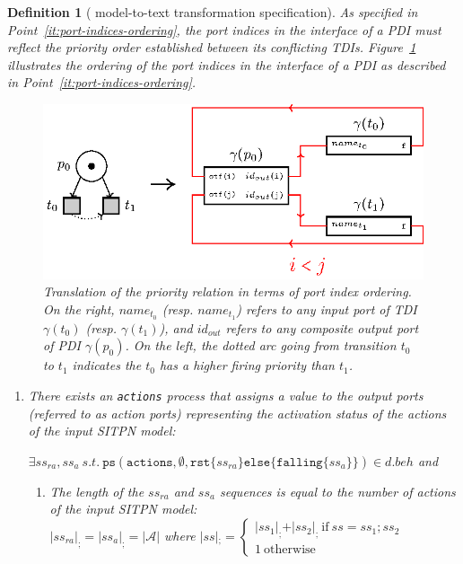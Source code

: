 \documentclass[pdflatex,sn-mathphys]{sn-jnl}%
\theoremstyle{thmstyleone}%
\theoremstyle{thmstyletwo}%
\theoremstyle{thmstylethree}%
\newtheorem{definition}{Definition}%
\begin{document}
\begin{definition}[\hilecop{} model-to-text transformation specification]
  \bigskip

  As specified in Point~\ref{it:port-indices-ordering}, the port
  indices in the interface of a PDI must reflect the priority order
  established between its \textit{conflicting} TDIs.%
  Figure~\ref{fig:gen-prio-order} illustrates the ordering of the port
  indices in the interface of a PDI as described in
  Point~\ref{it:port-indices-ordering}.

  \begin{figure}[h]
    \centering
    \includegraphics[keepaspectratio,width=.8\textwidth]{gen-prio-order.eps}
    \caption{Translation of the priority relation in terms of port
      index ordering. On the right, $name_{t_0}$ (resp. $name_{t_1}$)
      refers to any input port of TDI $\gamma(t_0)$
      (resp. $\gamma(t_1)$), and $id_{out}$ refers to any composite
      output port of PDI $\gamma(p_0)$. On the left, the dotted arc
      going from transition $t_0$ to $t_1$ indicates the $t_0$ has a
      higher firing priority than $t_1$. }
    \label{fig:gen-prio-order}
  \end{figure}

  \begin{enumerate}[resume]
  \item\label{it:actions} There exists an \texttt{actions} process
    that assigns a value to the output ports (referred to as
    \textit{action} ports) representing the activation status of the
    actions of the input SITPN model:
    
    $\exists{}ss_{ra},ss_{a}~s.t.~\mathtt{ps}(\mathtt{actions},\emptyset,\mathtt{rst}\{ss_{ra}\}\mathtt{else}\{\mathtt{falling}\{ss_a\}\})\in{}d.beh$
    and
    \begin{enumerate}
    \item The length of the $ss_{ra}$ and $ss_{a}$ sequences is equal
      to the number of actions of the input SITPN model:\\
      $\vert{}ss_{ra}\vert_{;}=\vert{}ss_a\vert_{;}=\vert\mathcal{A}\vert$
      where $\vert{}ss\vert{}_{;}=
      \begin{cases}
        \vert{}ss_1\vert_{;}+\vert{}ss_2\vert_{;}~\mathrm{if}~ss=ss_1;ss_2 \\
        1~\mathrm{otherwise}
      \end{cases}
      $
      

\end{enumerate}
\end{enumerate}
\end{definition}
\end{document}
